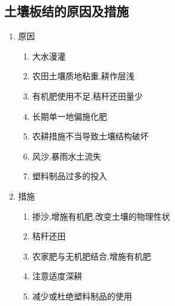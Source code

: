 \documentclass[a4paper]{article}
\begin{document}
    \subsection{土壤板结的原因及措施}
    \begin{enumerate}
        \item 原因
        \begin{enumerate}
            \item 大水漫灌
            \item 农田土壤质地粘重,耕作层浅
            \item 有机肥使用不足,秸秆还田量少
            \item 长期单一地偏施化肥
            \item 农耕措施不当导致土壤结构破坏
            \item 风沙,暴雨水土流失
            \item 塑料制品过多的投入
        \end{enumerate}
        \item 措施
        \begin{enumerate}
            \item 掺沙,增施有机肥,改变土壤的物理性状
            \item 秸秆还田
            \item 农家肥与无机肥结合,增施有机肥
            \item 注意适度深耕
            \item 减少或杜绝塑料制品的使用
        \end{enumerate}
    \end{enumerate}
\end{document}
